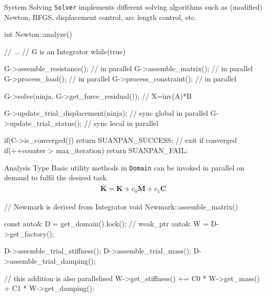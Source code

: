 \documentclass[fleqn,10pt]{beamer}
\begin{document}
\begin{frame}[containsverbatim]{System Solving}
\texttt{Solver} implements different solving algorithms such as (modified) Newton, BFGS, displacement control, arc length control, etc.
\begin{cppcode}
int Newton::analyze() {
    // ...
    // G is an Integrator
    while(true) {
        G->assemble_resistance(); // in parallel
        G->assemble_matrix();     // in parallel
        G->process_load();        // in parallel
        G->process_constraint();  // in parallel

        G->solve(ninja, G->get_force_residual()); // X=inv(A)*B

        G->update_trial_displacement(ninja); // sync global in parallel
        G->update_trial_status();            // sync local in parallel

        if(C->is_converged()) return SUANPAN_SUCCESS; // exit if converged
        if(++counter > max_iteration) return SUANPAN_FAIL;
    }
}
\end{cppcode}
\end{frame}
\begin{frame}[containsverbatim]{Analysis Type}
Basic utility methods in \texttt{Domain} can be invoked in parallel on demand to fulfil the desired task.
\begin{gather*}
\bar{\mathbold{K}}=\mathbold{K}+c_0\mathbold{M}+c_1\mathbold{C}
\end{gather*}
\begin{cppcode}
// Newmark is derived from Integrator
void Newmark::assemble_matrix() {
    const auto& D = get_domain().lock(); // weak_ptr
    auto& W = D->get_factory();

    D->assemble_trial_stiffness();
    D->assemble_trial_mass();
    D->assemble_trial_damping();

    // this addition is also parallelised
    W->get_stiffness() += C0 * W->get_mass() + C1 * W->get_damping();
}
\end{cppcode}
\end{frame}
\end{document}
